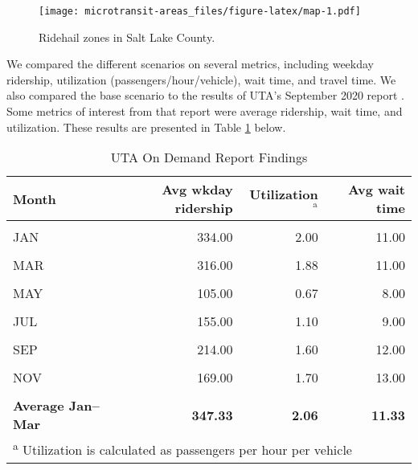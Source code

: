 \documentclass[3p, authoryear]{elsarticle} %
\begin{document}
\begin{figure}
\centering
\texttt{[image: microtransit-areas\_files/figure-latex/map-1.pdf]}
\caption{\label{fig:map}Ridehail zones in Salt Lake County.}
\end{figure}

We compared the different scenarios on several metrics, including weekday ridership, utilization (passengers/hour/vehicle), wait time, and travel time. We also compared the base scenario to the results of UTA's September 2020 report \citep{UTAreport}. Some metrics of interest from that report were average ridership, wait time, and utilization. These results are presented in Table \ref{tab:UTAOD} below.

\begin{table}[H]

\caption{\label{tab:UTAOD}UTA On Demand Report Findings}
\centering
\begin{tabular}[t]{lrrr}
\toprule
Month & Avg wkday ridership & Utilization$^{\text{a}}$ & Avg wait time\\
\midrule
\cellcolor{gray!6}{DEC} & \cellcolor{gray!6}{224.00} & \cellcolor{gray!6}{1.33} & \cellcolor{gray!6}{9.00}\\
JAN & 334.00 & 2.00 & 11.00\\
\cellcolor{gray!6}{FEB} & \cellcolor{gray!6}{392.00} & \cellcolor{gray!6}{2.31} & \cellcolor{gray!6}{12.00}\\
MAR & 316.00 & 1.88 & 11.00\\
\cellcolor{gray!6}{APR} & \cellcolor{gray!6}{275.00} & \cellcolor{gray!6}{1.52} & \cellcolor{gray!6}{10.00}\\
MAY & 105.00 & 0.67 & 8.00\\
\cellcolor{gray!6}{JUN} & \cellcolor{gray!6}{162.00} & \cellcolor{gray!6}{1.10} & \cellcolor{gray!6}{9.00}\\
JUL & 155.00 & 1.10 & 9.00\\
\cellcolor{gray!6}{AUG} & \cellcolor{gray!6}{193.00} & \cellcolor{gray!6}{1.50} & \cellcolor{gray!6}{12.00}\\
SEP & 214.00 & 1.60 & 12.00\\
\cellcolor{gray!6}{OCT} & \cellcolor{gray!6}{200.00} & \cellcolor{gray!6}{1.70} & \cellcolor{gray!6}{13.00}\\
NOV & 169.00 & 1.70 & 13.00\\
\textbf{\cellcolor{gray!6}{Average}} & \textbf{\cellcolor{gray!6}{228.25}} & \textbf{\cellcolor{gray!6}{1.53}} & \textbf{\cellcolor{gray!6}{10.75}}\\
\textbf{Average Jan--Mar} & \textbf{347.33} & \textbf{2.06} & \textbf{11.33}\\
\bottomrule
\multicolumn{4}{l}{\textsuperscript{a} Utilization is calculated as passengers per hour per vehicle}\\
\end{tabular}
\end{table}
\end{document}
